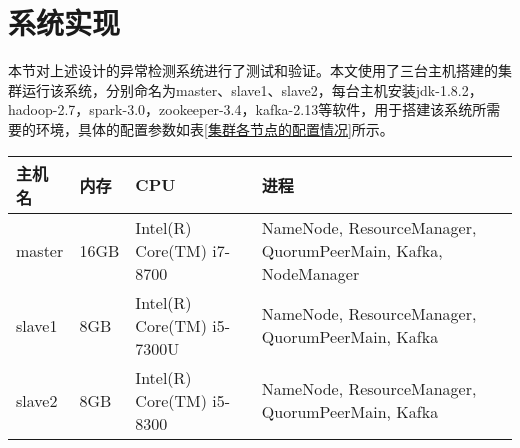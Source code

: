 





\section{系统实现}
本节对上述设计的异常检测系统进行了测试和验证。本文使用了三台主机搭建的集群运行该系统，分别命名为master、slave1、slave2，每台主机安装jdk-1.8.2，hadoop-2.7，spark-3.0，zookeeper-3.4，kafka-2.13等软件，用于搭建该系统所需要的环境，具体的配置参数如表\ref{集群各节点的配置情况}所示。
\begin{table*}[h]
  \small
  \caption{集群各节点的配置情况}
  \label{集群各节点的配置情况}
  \centering
  \begin{tabular}{p{}<{\centering} p{}<{\centering} p{}<{\centering} p{}<{\centering}}
  \toprule
  主机名 & 内存 & CPU &  进程 \\
  
  \midrule
 master & 16GB & Intel(R) Core(TM) i7-8700 & NameNode, ResourceManager, QuorumPeerMain, Kafka, NodeManager \\
 slave1 & 8GB & Intel(R) Core(TM) i5-7300U & NameNode, ResourceManager, QuorumPeerMain, Kafka \\
 slave2 & 8GB & Intel(R) Core(TM) i5-8300 & NameNode, ResourceManager, QuorumPeerMain, Kafka \\
 
   \bottomrule
  
  \end{tabular}
  \end{table*}

